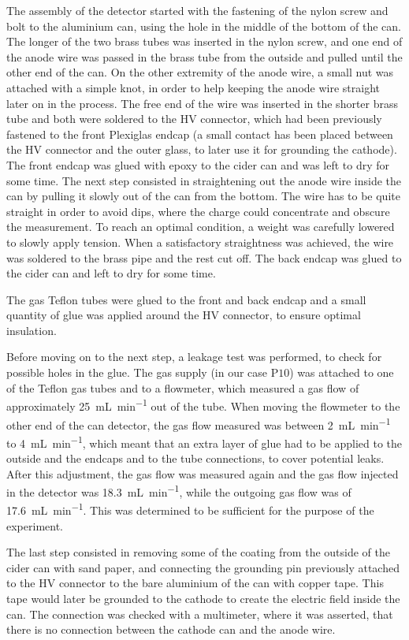 The assembly of the detector started with the fastening of the nylon screw and
bolt to the aluminium can, using the hole in the middle of the bottom of the
can. The longer of the two brass tubes was inserted in the nylon screw, and one
end of the anode wire was passed in the brass tube from the outside and pulled
until the other end of the can. On the other extremity of the anode wire, a
small nut was attached with a simple knot, in order to help keeping the anode
wire straight later on in the process. The free end of the wire was inserted in
the shorter brass tube and both were soldered to the HV connector, which
had been previously fastened to the front Plexiglas endcap (a small contact
has been placed between the HV connector and the outer glass, to later
use it for grounding the cathode). The front endcap was glued with epoxy to the
cider can and was left to dry for some time. The next step consisted in
straightening out the anode wire inside the can by pulling it slowly out of the
can from the bottom. The wire has to be quite straight in order to avoid dips,
where the charge could concentrate and obscure the measurement. To reach an
optimal condition, a weight was carefully lowered to slowly apply tension.
When a satisfactory straightness was achieved, the wire was soldered to the
brass pipe and the rest cut off. The back endcap was glued to the cider can and
left to dry for some time.

The gas Teflon tubes were glued to the front and back endcap and a small
quantity of glue was applied around the HV connector, to ensure optimal
insulation.

Before moving on to the next step, a leakage test was performed, to check for
possible holes in the glue. The gas supply (in our case $\mathrm{P10}$) was
attached to one of the Teflon gas tubes and to a flowmeter, which measured a gas
flow of approximately \SI{25}{\milli\liter\per\minute} out of the tube. When
moving the flowmeter to the other end of the can detector, the gas flow measured
was between \SI{2}{\milli\liter\per\minute} to \SI{4}{\milli\liter\per\minute}, which meant that an extra layer
of glue had to be applied to the outside and the endcaps and to the tube
connections, to cover potential leaks. After this adjustment, the gas
flow was measured again and the gas flow injected in the detector was
\SI{18.3}{\milli\liter\per\minute}, while the outgoing gas flow was of
\SI{17.6}{\milli\liter\per\minute}. This was determined to be sufficient for the
purpose of the experiment.

The last step consisted in removing some of the coating from the outside of the cider can with sand paper, and connecting the grounding pin previously attached
to the HV connector to the bare aluminium of the can with copper tape. This tape would later be grounded to the cathode to create the electric field inside the can. The
connection was checked with a multimeter, where it was asserted, that there is no connection between the cathode can and the anode wire.

